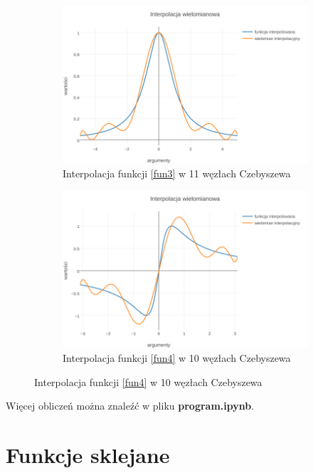 \documentclass{article}
\begin{document}
\begin{figure}[ht]
	\centering
	\begin{subfigure}[ht]{0.5\textwidth}
		\includegraphics[width=\textwidth]{chebyshev_lagrange_c}
		\caption{Interpolacja funkcji \eqref{fun3} w 11 węzłach Czebyszewa}
		\label{fig:2}
	\end{subfigure}%
	\begin{subfigure}[ht]{0.5\textwidth}
		\includegraphics[width=\textwidth]{chebyshev_lagrange_d}
		\caption{Interpolacja funkcji \eqref{fun4} w 10 węzłach Czebyszewa}
		\label{fig:3}
	\end{subfigure}
\end{figure}



Więcej obliczeń można znaleźć w pliku \textbf{program.ipynb}.

\section{Funkcje sklejane}
\end{document}

